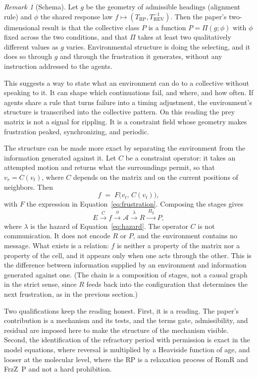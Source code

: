 \documentclass[11pt]{article}
\theoremstyle{definition}
\theoremstyle{remark}
\newtheorem{remark}{Remark}
\newcommand{\Trp}{T_{\mathrm{RP}}}
\newcommand{\Trev}{T_{\mathrm{REV}}}
\newcommand{\A}{\mathcal{A}}
\begin{document}
\begin{remark}[Schema]
Let $g$ be the geometry of admissible headings (alignment rule) and $\phi$ the shared response law $f\mapsto(\Trp,\Trev^{-1})$. Then the paper's two-dimensional result is that the collective class $P$ is a function $P=\Pi(g;\phi)$ with $\phi$ fixed across the two conditions, and that $\Pi$ takes at least two qualitatively different values as $g$ varies. Environmental structure is doing the selecting, and it does so through $g$ and through the frustration it generates, without any instruction addressed to the agents.
\end{remark}

This suggests a way to state what an environment can do to a collective without speaking to it. It can shape which continuations fail, and where, and how often. If agents share a rule that turns failure into a timing adjustment, the environment's structure is transcribed into the collective pattern. On this reading the prey matrix is not a signal for rippling. It is a constraint field whose geometry makes frustration peaked, synchronizing, and periodic.

The structure can be made more exact by separating the environment from the information generated against it. Let $C$ be a constraint operator: it takes an attempted motion and returns what the surroundings permit, so that $v_r = C(v_t)$, where $C$ depends on the matrix and on the current positions of neighbors. Then
\[
  f \;=\; F\big(v_t,\,C(v_t)\big),
\]
with $F$ the expression in Equation~\eqref{eq:frustration}. Composing the stages gives
\[
  E \xrightarrow{\;C\;} f \xrightarrow{\;\phi\;} \A \xrightarrow{\;\lambda\;} R \xrightarrow{\;\Pi_g\;} P,
\]
where $\lambda$ is the hazard of Equation~\eqref{eq:hazard}. The operator $C$ is not communication. It does not encode $R$ or $P$, and the environment contains no message. What exists is a relation: $f$ is neither a property of the matrix nor a property of the cell, and it appears only when one acts through the other. This is the difference between information supplied by an environment and information generated against one. (The chain is a composition of stages, not a causal graph in the strict sense, since $R$ feeds back into the configuration that determines the next frustration, as in the previous section.)

Two qualifications keep the reading honest. First, it is a reading. The paper's contribution is a mechanism and its tests, and the terms gate, admissibility, and residual are imposed here to make the structure of the mechanism visible. Second, the identification of the refractory period with permission is exact in the model equations, where reversal is multiplied by a Heaviside function of age, and looser at the molecular level, where the RP is a relaxation process of RomR and FrzZ~P and not a hard prohibition.
\end{document}
